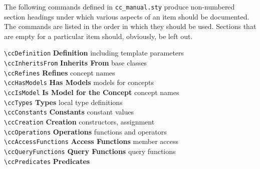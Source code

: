 The following commands defined in {\tt cc\_manual.sty} produce non-numbered
section headings under which various aspects of an item should be documented.  
The commands are listed in the order in which they should be used.  Sections
that are empty for a particular item should, obviously, be left out. 

\begin{tabbing}
  \> \verb+\ccDefinition+      \>  {\bf Definition}    \>
                                          including template parameters\\
  \> \verb+\ccInheritsFrom+    \>  {\bf Inherits From}     \>
                                                     base classes\\
  \> \verb+\ccRefines+         \>  {\bf Refines}     \>
                                                     concept names\\
  \> \verb+\ccHasModels+       \>  {\bf Has Models}     \>
                                                     models for concepts\\
  \> \verb+\ccIsModel+         \>  {\bf Is Model for the Concept}     \>
                                                     concept names\\
  \> \verb+\ccTypes+           \>  {\bf Types}         \>
                                                     local type definitions\\ 
  \> \verb+\ccConstants+       \>  {\bf Constants}     \>
                                                     constant values\\
  \> \verb+\ccCreation+        \>  {\bf Creation}      \>
                                                     constructors, assignment\\ 
  \> \verb+\ccOperations+      \>  {\bf Operations}    \>
                                                     functions and operators\\ 
  \> \verb+\ccAccessFunctions+ \>  {\bf Access Functions}    \>
                                                     member access\\ 
  \> \verb+\ccQueryFunctions+ \>   {\bf Query Functions}    \>
                                                     query functions\\
  \> \verb+\ccPredicates+      \>  {\bf Predicates}    \>

\end{tabbing}
